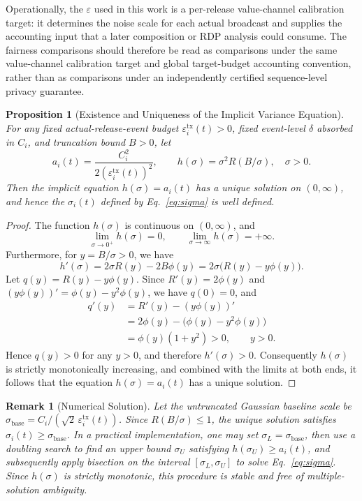 \documentclass[10pt]{article}
\newtheorem{proposition}[theorem]{Proposition}
\newtheorem{remark}{Remark}[section]
\begin{document}
Operationally, the $\varepsilon$ used in this work is a per-release value-channel calibration target: it determines the noise scale for each actual broadcast and supplies the accounting input that a later composition or RDP analysis could consume. The fairness comparisons should therefore be read as comparisons under the same value-channel calibration target and global target-budget accounting convention, rather than as comparisons under an independently certified sequence-level privacy guarantee.

\begin{proposition}[Existence and Uniqueness of the Implicit Variance Equation]\label{prop:sigma}
  For any fixed actual-release-event budget $\varepsilon_i^{\mathrm{tx}}(t)>0$, fixed event-level $\delta$ absorbed in $C_i$, and truncation bound $B>0$, let
  \[
    a_i(t)=\frac{C_i^2}{2(\varepsilon_i^{\mathrm{tx}}(t))^2},\qquad
    h(\sigma)=\sigma^2 R(B/\sigma),\quad \sigma>0.
  \]
  Then the implicit equation $h(\sigma)=a_i(t)$ has a unique solution on $(0,\infty)$, and hence the $\sigma_i(t)$ defined by Eq.~\eqref{eq:sigma} is well defined.
\end{proposition}

\begin{proof}
The function $h(\sigma)$ is continuous on $(0,\infty)$, and
\[
  \lim_{\sigma\to0^+}h(\sigma)=0,\qquad
  \lim_{\sigma\to\infty}h(\sigma)=+\infty.
\]
Furthermore, for $y=B/\sigma>0$, we have
\[
  h'(\sigma)=2\sigma R(y)-2B\phi(y)=2\sigma\bigl(R(y)-y\phi(y)\bigr).
\]
Let $q(y)=R(y)-y\phi(y)$. Since $R'(y)=2\phi(y)$ and $(y\phi(y))'=\phi(y)-y^2\phi(y)$, we have $q(0)=0$, and
\begin{equation}
  \begin{aligned}
    q'(y)
    &=R'(y)-(y\phi(y))'\\
    &=2\phi(y)-\bigl(\phi(y)-y^2\phi(y)\bigr)\\
    &=\phi(y)(1+y^2)>0,\qquad y>0.
  \end{aligned}
\end{equation}
Hence $q(y)>0$ for any $y>0$, and therefore $h'(\sigma)>0$. Consequently $h(\sigma)$ is strictly monotonically increasing, and combined with the limits at both ends, it follows that the equation $h(\sigma)=a_i(t)$ has a unique solution.
\end{proof}

\begin{remark}[Numerical Solution]
  Let the untruncated Gaussian baseline scale be $\sigma_{\mathrm{base}}=C_i/(\sqrt{2}\,\varepsilon_i^{\mathrm{tx}}(t))$. Since $R(B/\sigma)\leq1$, the unique solution satisfies $\sigma_i(t)\geq \sigma_{\mathrm{base}}$. In a practical implementation, one may set $\sigma_L=\sigma_{\mathrm{base}}$, then use a doubling search to find an upper bound $\sigma_U$ satisfying $h(\sigma_U)\geq a_i(t)$, and subsequently apply bisection on the interval $[\sigma_L,\sigma_U]$ to solve Eq.~\eqref{eq:sigma}. Since $h(\sigma)$ is strictly monotonic, this procedure is stable and free of multiple-solution ambiguity.
\end{remark}
\end{document}
